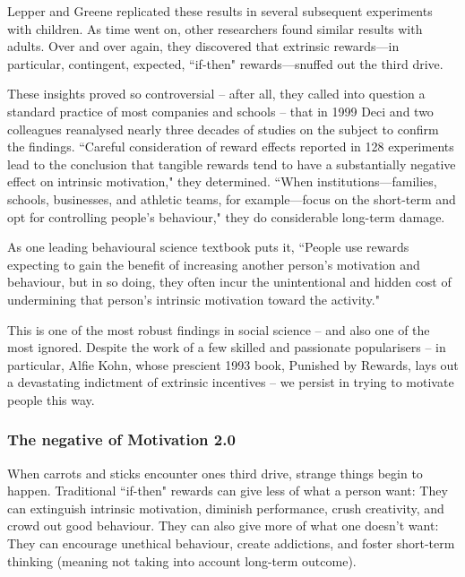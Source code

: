 Lepper and Greene replicated these results in several subsequent experiments with children. As time went on, other researchers found similar results with adults. Over and over again, they discovered that extrinsic rewards—in particular, contingent, expected, ``if-then" rewards—snuffed out the third drive.

These insights proved so controversial -- after all, they called into question a standard practice of most companies and schools -- that in 1999 Deci and two colleagues reanalysed nearly three decades of studies on the subject to confirm the findings. ``Careful consideration of reward effects reported in 128 experiments lead to the conclusion that tangible rewards tend to have a substantially negative effect on intrinsic motivation," they determined. ``When institutions—families, schools, businesses, and athletic teams, for example—focus on the short-term and opt for controlling people’s behaviour," they do considerable long-term damage.

As one leading behavioural science textbook puts it, ``People use rewards expecting to gain the benefit of increasing another person’s motivation and behaviour, but in so doing, they often incur the unintentional and hidden cost of undermining that person’s intrinsic motivation toward the activity."

This is one of the most robust findings in social science -- and also one of the most ignored. Despite the work of a few skilled and passionate popularisers -- in particular, Alfie Kohn, whose prescient 1993 book, Punished by Rewards, lays out a devastating indictment of extrinsic incentives -- we persist in trying to motivate people this way.

\subsubsection{The negative of Motivation 2.0}
When carrots and sticks encounter ones third drive, strange things begin to happen. Traditional ``if-then" rewards can give  less of what a person want: They can extinguish intrinsic motivation, diminish performance, crush creativity, and crowd out good behaviour. They can also give more of what one doesn’t want: They can encourage unethical behaviour, create addictions, and foster short-term thinking (meaning not taking into account long-term outcome).

